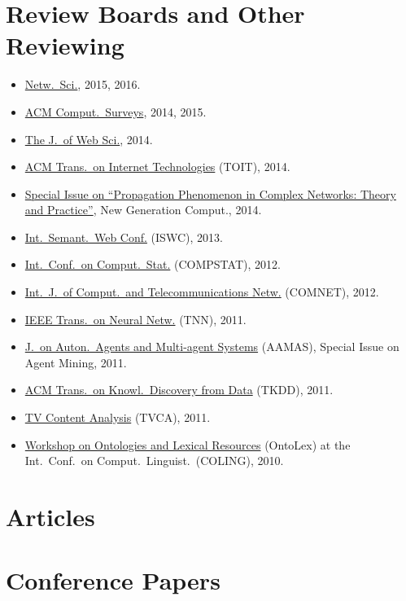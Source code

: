 \documentclass[line,mm]{res}
\newcounter{x}
\begin{document}
\begin{resume}
\section{Review Boards and Other Reviewing}
\begin{itemize}
\item \href{http://journals.cambridge.org/action/displayJournal?jid=NWS}{Netw.\ Sci.}, 2015, 2016.
\item \href{http://surveys.acm.org/}{ACM Comput.\ Surveys}, 2014, 2015. 
\item \href{http://www.webscience-journal.net}{The J.\ of Web Sci.}, 2014. 
\item \href{http://toit.acm.org/}{ACM Trans.\ on Internet
  Technologies} (TOIT), 2014.  
\item \href{http://www.ii.pwr.wroc.pl/~krol/eng_EPP.htm}{Special
  Issue on ``Propagation Phenomenon in Complex Networks:  Theory and
  Practice''}, New Generation Comput., 2014. 
\item \href{http://iswc2013.semanticweb.org/}{Int.\ Semant.\ Web Conf.}
  (ISWC), 2013.  
\item \href{http://www.compstat2012.org/}{Int.\ Conf.\ on Comput.\ Stat.} (COMPSTAT), 2012.  
\item
  \href{http://www.journals.elsevier.com/computer-networks/}{Int.\ J.\ of
    Comput.\ and Telecommunications Netw.} (COMNET), 2012. 
\item \href{http://ieee-cis.org/pubs/tnn/}{IEEE Trans.\ on Neural
  Netw.} (TNN), 2011.   
\item
  \href{http://www.springer.com/computer/ai/journal/10458}{J.\ on Auton.\ Agents and Multi-agent Systems} (AAMAS), Special Issue on Agent Mining,
  2011. 
\item \href{http://tkdd.cs.uiuc.edu/}{ACM Trans.\ on Knowl.\ Discovery from Data} (TKDD), 2011.  
\item \href{http://mklab.iti.gr/tvca/}{TV Content Analysis} (TVCA), 2011.
\item \href{http://www.loa-cnr.it/ontolex2010}{Workshop on Ontologies
  and Lexical Resources} (OntoLex) at the Int.\ Conf.\ on Comput.\ Linguist.\ (COLING), 2010. 
\end{itemize}

\section{Articles}           
\section{Conference Papers}  

\end{resume}
\end{document}
